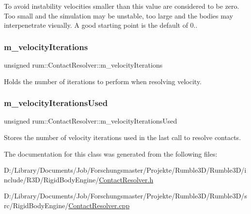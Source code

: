 To avoid instability velocities smaller than this value are considered to be zero. Too small and the simulation may be unstable, too large and the bodies may interpenetrate visually. A good starting point is the default of 0.. \mbox{\label{classrum_1_1_contact_resolver_a69b94c3b3bffe713655ed4b2209d17c3}} 
\subsubsection{\texorpdfstring{m\+\_\+velocity\+Iterations}{m\_velocityIterations}}
{\footnotesize\ttfamily unsigned rum\+::\+Contact\+Resolver\+::m\+\_\+velocity\+Iterations\hspace{0.3cm}{\ttfamily [protected]}}

Holds the number of iterations to perform when resolving velocity. \mbox{\label{classrum_1_1_contact_resolver_a1f26bcb510350f094a9488c09125bcd7}} 
\subsubsection{\texorpdfstring{m\+\_\+velocity\+Iterations\+Used}{m\_velocityIterationsUsed}}
{\footnotesize\ttfamily unsigned rum\+::\+Contact\+Resolver\+::m\+\_\+velocity\+Iterations\+Used\hspace{0.3cm}{\ttfamily [protected]}}

Stores the number of velocity iterations used in the last call to resolve contacts. 

The documentation for this class was generated from the following files\+:\begin{DoxyCompactItemize}
\item 
D\+:/\+Library/\+Documents/\+Job/\+Forschungsmaster/\+Projekte/\+Rumble3\+D/\+Rumble3\+D/include/\+R3\+D/\+Rigid\+Body\+Engine/\mbox{\hyperlink{_contact_resolver_8h}{Contact\+Resolver.\+h}}\item 
D\+:/\+Library/\+Documents/\+Job/\+Forschungsmaster/\+Projekte/\+Rumble3\+D/\+Rumble3\+D/src/\+Rigid\+Body\+Engine/\mbox{\hyperlink{_contact_resolver_8cpp}{Contact\+Resolver.\+cpp}}\end{DoxyCompactItemize}
